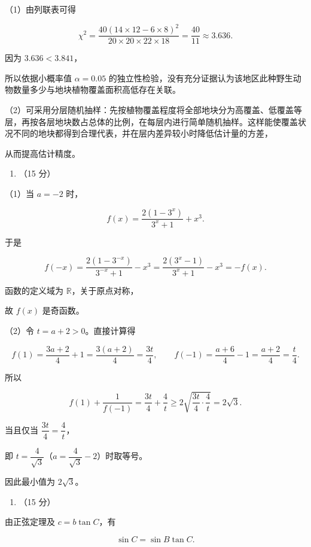 \documentclass[UTF8,12pt,a4paper]{ctexart}
\renewcommand{\labelenumi}{\arabic{enumi}.}
\providecommand{\tightlist}{%
  \setlength{\itemsep}{0pt}\setlength{\parskip}{0pt}}
\begin{document}
（1）由列联表可得

\[
   \chi^2=\dfrac{40(14\times12-6\times8)^2}{20\times20\times22\times18}
   =\dfrac{40}{11}\approx3.636.
   \]

因为 \(3.636<3.841\)，

所以依据小概率值 \(\alpha=0.05\) 的独立性检验，没有充分证据认为该地区此种野生动物数量多少与地块植物覆盖面积高低存在关联。

（2）可采用分层随机抽样：先按植物覆盖程度将全部地块分为高覆盖、低覆盖等层，再按各层地块数占总体的比例，在每层内进行简单随机抽样。这样能使覆盖状况不同的地块都得到合理代表，并在层内差异较小时降低估计量的方差，

从而提高估计精度。

\begin{enumerate}
\def\labelenumi{\arabic{enumi}.}
\setcounter{enumi}{15}
\tightlist
\item
  （15 分）
\end{enumerate}

（1）当 \(a=-2\) 时，

\[
   f(x)=\dfrac{2(1-3^x)}{3^x+1}+x^3.
   \]

于是

\[
   f(-x)=\dfrac{2(1-3^{-x})}{3^{-x}+1}-x^3
   =\dfrac{2(3^x-1)}{3^x+1}-x^3=-f(x).
   \]

函数的定义域为 \(\mathbb R\)，关于原点对称，

故 \(f(x)\) 是奇函数。

（2）令 \(t=a+2>0\)。直接计算得

\[
   f(1)=\dfrac{3a+2}{4}+1=\dfrac{3(a+2)}4=\dfrac{3t}{4},
   \qquad
   f(-1)=\dfrac{a+6}{4}-1=\dfrac{a+2}{4}=\frac t4.
   \]

所以

\[
   f(1)+\frac1{f(-1)}=\dfrac{3t}{4}+\frac4t
   \ge 2\sqrt{\dfrac{3t}{4}\cdot\frac4t}=2\sqrt3.
   \]

当且仅当 \(\dfrac{3t}{4}=\dfrac4t\)，

即 \(t=\dfrac4{\sqrt3}\)（\(a=\dfrac4{\sqrt3}-2\)）时取等号。

因此最小值为 \(2\sqrt3\)。

\begin{enumerate}
\def\labelenumi{\arabic{enumi}.}
\setcounter{enumi}{16}
\tightlist
\item
  （15 分）
\end{enumerate}

由正弦定理及 \(c=b\tan C\)，有

\[
   \sin C=\sin B\tan C.
   \]
\end{document}
